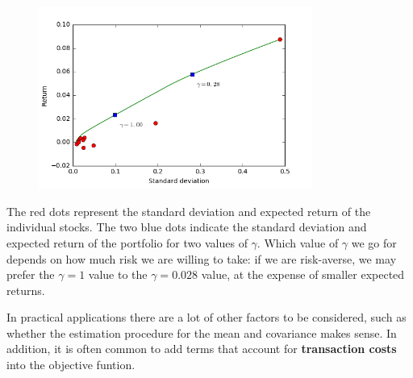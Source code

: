\begin{figure}
\centering
\includegraphics[width=0.8\textwidth]{images/meanvar.png}
\end{figure}

The red dots represent the standard deviation and expected return of the individual stocks. The two blue dots indicate the standard deviation and expected return of the portfolio for two values of $\gamma$. Which value of $\gamma$ we go for depends on how much risk we are willing to take: if we are risk-averse, we may prefer the $\gamma=1$ value to the $\gamma=0.028$ value, at the expense of smaller expected returns.

In practical applications there are a lot of other factors to be considered, such as whether the estimation procedure for the mean and covariance makes sense. In addition, it is often common to add terms that account for \textbf{transaction costs} into the objective funtion.

